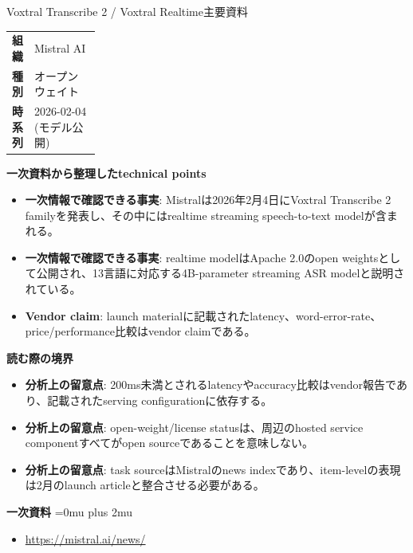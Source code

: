 \begin{technicalnote}{Voxtral Transcribe 2 / Voxtral Realtime}{主要資料}
\begingroup
\begin{tabularx}{\linewidth}{@{}>{\bfseries}p{0.22\linewidth}X@{}}
組織 & Mistral AI \\
種別 & オープンウェイト \\
時系列 & 2026-02-04 (モデル公開) \\
\end{tabularx}
\smallskip
{\bfseries 一次資料から整理したtechnical points}
\begin{itemize}[leftmargin=1.5em,itemsep=0.35em]
\item \textbf{一次情報で確認できる事実}: Mistralは2026年2月4日にVoxtral Transcribe 2 familyを発表し、その中にはrealtime streaming speech-to-text modelが含まれる。
\item \textbf{一次情報で確認できる事実}: realtime modelはApache 2.0のopen weightsとして公開され、13言語に対応する4B-parameter streaming ASR modelと説明されている。
\item \textbf{Vendor claim}: launch materialに記載されたlatency、word-error-rate、price/performance比較はvendor claimである。
\end{itemize}
\begin{minipage}{\linewidth}
{\bfseries 読む際の境界}
\begin{itemize}[leftmargin=1.5em,itemsep=0.35em]
\item \textbf{分析上の留意点}: 200ms未満とされるlatencyやaccuracy比較はvendor報告であり、記載されたserving configurationに依存する。
\item \textbf{分析上の留意点}: open-weight/license statusは、周辺のhosted service componentすべてがopen sourceであることを意味しない。
\item \textbf{分析上の留意点}: task sourceはMistralのnews indexであり、item-levelの表現は2月のlaunch articleと整合させる必要がある。
\end{itemize}
\begin{samepage}
{\bfseries 一次資料}
\begingroup\sloppy
\Urlmuskip=0mu plus 2mu\relax
\begin{itemize}[leftmargin=1.5em,itemsep=0.25em]
\item {\scriptsize\url{https://mistral.ai/news/}}
\end{itemize}
\endgroup
\end{samepage}
\end{minipage}
\endgroup
\end{technicalnote}
\medskip


